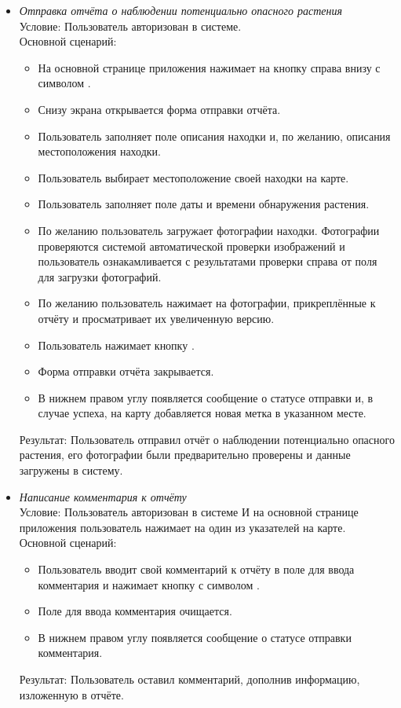 \begin{itemize}[topsep=0pt, parsep=0pt, itemsep=0pt, leftmargin=*, labelindent=0.5cm]
	\item \textit{Отправка отчёта о наблюдении потенциально опасного растения} \\
	Условие: Пользователь авторизован в системе. \\
	Основной сценарий:
	\begin{itemize}[topsep=0pt, parsep=0pt, itemsep=0pt, leftmargin=*, labelindent=0.5cm]
		\item На основной странице приложения нажимает на кнопку справа внизу с символом \textquote{+}.
		\item Снизу экрана открывается форма отправки отчёта.
		\item Пользователь заполняет поле описания находки и, по желанию, описания местоположения находки.
		\item Пользователь выбирает местоположение своей находки на карте.
		\item Пользователь заполняет поле даты и времени обнаружения растения.
		\item По желанию пользователь загружает фотографии находки. Фотографии проверяются системой автоматической проверки изображений и пользователь ознакамливается с результатами проверки справа от поля для загрузки фотографий.
		\item По желанию пользователь нажимает на фотографии, прикреплённые к отчёту и просматривает их увеличенную версию.
		\item Пользователь нажимает кнопку .
		\item Форма отправки отчёта закрывается.
		\item В нижнем правом углу появляется сообщение о статусе отправки и, в случае успеха, на карту добавляется новая метка в указанном месте.
	\end{itemize}
	Результат: Пользователь отправил отчёт о наблюдении потенциально опасного растения, его фотографии были предварительно проверены и данные загружены в систему.
	
	\item \textit{Написание комментария к отчёту} \\
	Условие: Пользователь авторизован в системе И на основной странице приложения пользователь нажимает на один из указателей на карте. \\
	Основной сценарий:
	\begin{itemize}[topsep=0pt, parsep=0pt, itemsep=0pt, leftmargin=*, labelindent=0.5cm]
		\item Пользователь вводит свой комментарий к отчёту в поле для ввода комментария и нажимает кнопку с символом \textquote{>}.
		\item Поле для ввода комментария очищается.
		\item В нижнем правом углу появляется сообщение о статусе отправки комментария.
	\end{itemize}
	Результат: Пользователь оставил комментарий, дополнив информацию, изложенную в отчёте.
	

\end{itemize}

